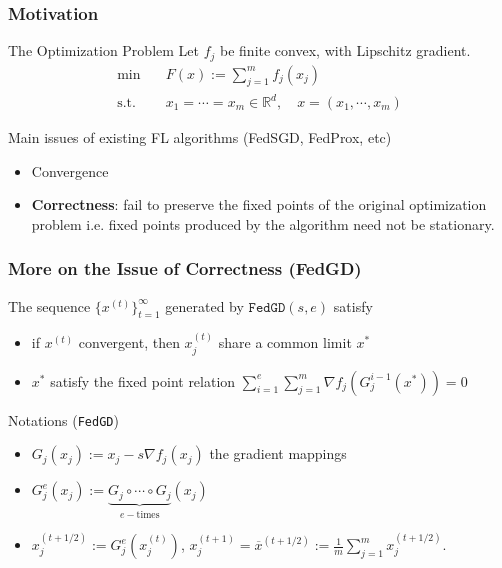 \begin{frame}
\frametitle{Motivation}

\begin{block}{The Optimization Problem}
Let $f_j$ be finite convex, with Lipschitz gradient.
\vspace{-0.6em}
\begin{align*}
    \text{min} & \quad F(x) := \sum_{j=1}^m f_j(x_j) \\
    \text{s.t.} & \quad x_1 = \cdots = x_m \in \mathbb{R}^d, \quad x = (x_1, \cdots, x_m)
\end{align*}
\end{block}

Main issues of existing FL algorithms (FedSGD, FedProx, etc)

\begin{itemize}
    \item Convergence
    \item {\bf Correctness}: fail to preserve the fixed points of the original optimization problem i.e. fixed points produced by the algorithm need not be stationary.
\end{itemize}


\end{frame}


\begin{frame}
\frametitle{More on the Issue of Correctness (FedGD)}

\begin{prop}
The sequence $\{x^{(t)}\}_{t=1}^{\infty}$ generated by $\texttt{FedGD}(s,e)$ satisfy
\begin{itemize}
    \item if $x^{(t)}$ convergent, then $x_j^{(t)}$ share a common limit $x^*$
    \vspace{-0.3em}
    \item $x^*$ satisfy the fixed point relation {\smaller$\sum\limits_{i=1}^e\sum\limits_{j=1}^m \nabla f_j(G_j^{i-1}(x^*)) = 0$}
\end{itemize}
\end{prop}

\begin{block}{Notations (\texttt{FedGD})}
\begin{itemize}
\item $G_j(x_j) := x_j - s\nabla f_j(x_j)$ the gradient mappings
\item $G^e_j(x_j) := \underbrace{G_j\circ\cdots\circ G_j}_{e-\text{times}} (x_j)$
\item $x_j^{(t+1/2)} := G^e_j(x_j^{(t)})$, $x_j^{(t+1)} = \overline{x}^{(t+1/2)}:=\frac{1}{m}\sum\limits_{j=1}^m x_j^{(t+1/2)}.$
\end{itemize}
\end{block}

\end{frame}

